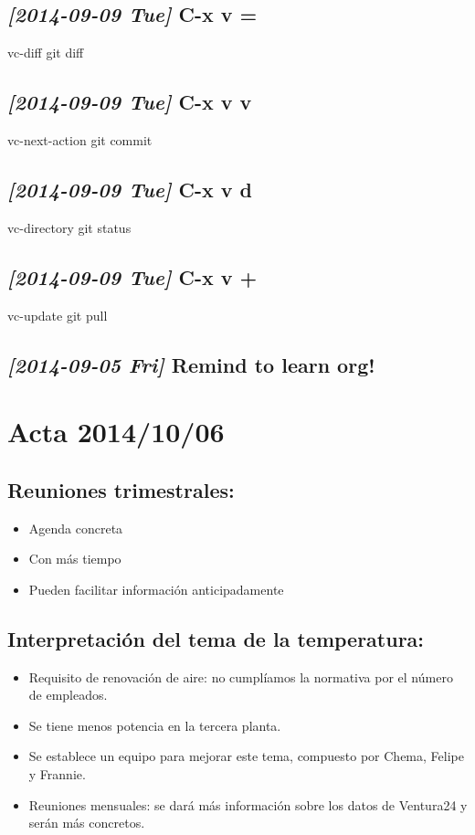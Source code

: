 \documentclass[11pt]{article}
\begin{document}
\subsection{\textit{[2014-09-09 Tue]} C-x v =}
\label{sec-1-27}
vc-diff
git diff
\subsection{\textit{[2014-09-09 Tue]} C-x v v}
\label{sec-1-28}
vc-next-action
git commit
\subsection{\textit{[2014-09-09 Tue]} C-x v d}
\label{sec-1-29}
vc-directory
git status
\subsection{\textit{[2014-09-09 Tue]} C-x v +}
\label{sec-1-30}
vc-update
git pull
\subsection{\textit{[2014-09-05 Fri]} Remind to learn org!}
\label{sec-1-31}
\section{Acta 2014/10/06}
\label{sec-2}
\subsection{Reuniones trimestrales:}
\label{sec-2-1}
\begin{itemize}
\item Agenda concreta
\item Con más tiempo
\item Pueden facilitar información anticipadamente
\end{itemize}
\subsection{Interpretación del tema de la temperatura:}
\label{sec-2-2}
\begin{itemize}
\item Requisito de renovación de aire: no cumplíamos la normativa por el número de empleados.
\item Se tiene menos potencia en la tercera planta.
\item Se establece un equipo para mejorar este tema, compuesto por Chema, Felipe y Frannie.
\item Reuniones mensuales: se dará más información sobre los datos de Ventura24 y serán más concretos.
\end{itemize}
\end{document}
